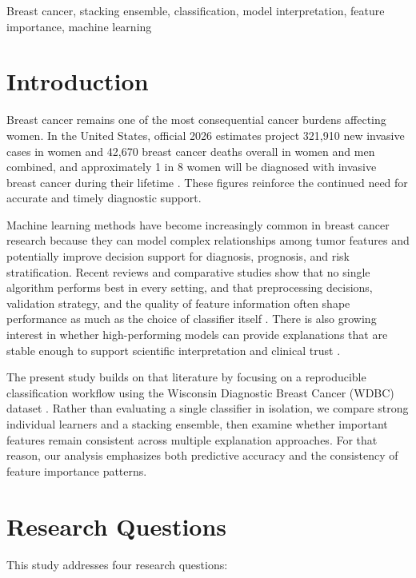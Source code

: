 \documentclass[conference]{IEEEtran}
\begin{document}
\begin{IEEEkeywords}
Breast cancer, stacking ensemble, classification, model interpretation, feature importance, machine learning
\end{IEEEkeywords}

\section{Introduction}
Breast cancer remains one of the most consequential cancer burdens affecting women. In the United States, official 2026 estimates project 321,910 new invasive cases in women and 42,670 breast cancer deaths overall in women and men combined, and approximately 1 in 8 women will be diagnosed with invasive breast cancer during their lifetime \cite{b1,b2}. These figures reinforce the continued need for accurate and timely diagnostic support.

Machine learning methods have become increasingly common in breast cancer research because they can model complex relationships among tumor features and potentially improve decision support for diagnosis, prognosis, and risk stratification. Recent reviews and comparative studies show that no single algorithm performs best in every setting, and that preprocessing decisions, validation strategy, and the quality of feature information often shape performance as much as the choice of classifier itself \cite{b3,b4,b5,b6}. There is also growing interest in whether high-performing models can provide explanations that are stable enough to support scientific interpretation and clinical trust \cite{b7}.

The present study builds on that literature by focusing on a reproducible classification workflow using the Wisconsin Diagnostic Breast Cancer (WDBC) dataset \cite{b8}. Rather than evaluating a single classifier in isolation, we compare strong individual learners and a stacking ensemble, then examine whether important features remain consistent across multiple explanation approaches. For that reason, our analysis emphasizes both predictive accuracy and the consistency of feature importance patterns.

\section{Research Questions}
This study addresses four research questions:
\end{document}
